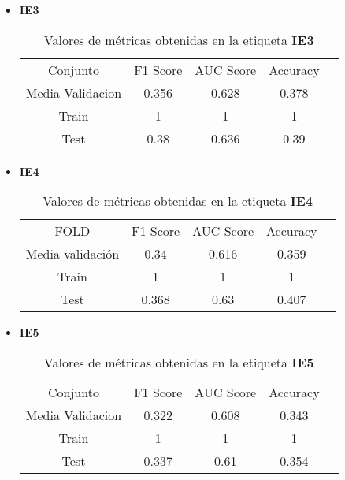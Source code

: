 \begin{itemize}
	\item  \textbf{IE3}
	      \begin{table}[H]
		      \centering
		      \begin{tabular}{|c|c|c|c|c}
			      \cline{1-4}
			      Conjunto         & F1 Score & AUC Score & Accuracy \\ \cline{1-4}
			      Media Validacion & 0.356    & 0.628     & 0.378    \\ \cline{1-4}
			      Train            & 1        & 1         & 1        \\ \cline{1-4}
			      Test             & 0.38     & 0.636     & 0.39     \\ \cline{1-4}
		      \end{tabular}
		      \caption{Valores de métricas obtenidas en la etiqueta \textbf{IE3}}
	      \end{table}
	\item  \textbf{IE4}
	      \begin{table}[H]
		      \centering
		      \begin{tabular}{|c|c|c|c|c}
			      \cline{1-4}
			      FOLD             & F1 Score & AUC Score & Accuracy \\ \cline{1-4}
			      Media validación & 0.34     & 0.616     & 0.359    \\ \cline{1-4}
			      Train            & 1        & 1         & 1        \\ \cline{1-4}
			      Test             & 0.368    & 0.63      & 0.407    \\ \cline{1-4}
		      \end{tabular}
		      \caption{Valores de métricas obtenidas en la etiqueta \textbf{IE4}}
	      \end{table}
	\item  \textbf{IE5}
	      \begin{table}[H]
		      \centering
		      \begin{tabular}{|c|c|c|c|c}
			      \cline{1-4}
			      Conjunto         & F1 Score & AUC Score & Accuracy \\ \cline{1-4}
			      Media Validacion & 0.322    & 0.608     & 0.343    \\ \cline{1-4}
			      Train            & 1        & 1         & 1        \\ \cline{1-4}
			      Test             & 0.337    & 0.61      & 0.354    \\ \cline{1-4}
		      \end{tabular}
		      \caption{Valores de métricas obtenidas en la etiqueta \textbf{IE5}}

\end{table}
\end{itemize}
